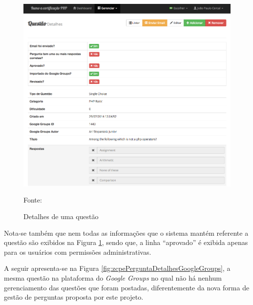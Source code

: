 \begin{figure}[h!tb]
	\caption{Detalhes de uma questão}
	\label{fig:zcpePerguntaDetalhes}

	\centering
	\includegraphics[width=\textwidth]{images/resultados/zcpe-pergunta-detalhes.png}

	\centering
	\footnotesize Fonte: \fonteOAutor
\end{figure}

\FloatBarrier 	%

Nota-se também que nem todas as informações que o sistema mantém referente a
questão são exibidos na Figura \ref{fig:zcpePerguntaDetalhes}, sendo que, a
linha ``aprovado'' é exibida apenas para os usuários com permissões
administrativas.

A seguir apresenta-se na Figura \ref{fig:zcpePerguntaDetalhesGoogleGroups}, a
mesma questão na plataforma do \textit{Google Groups} no qual não há nenhum gerenciamento das questões que
foram postadas, diferentemente da nova forma de gestão de perguntas proposta por
este projeto.


